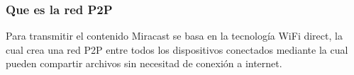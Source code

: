 \begin{frame}
  \frametitle{Que es la red P2P}
  Para transmitir el contenido Miracast se basa en la tecnología WiFi direct, la cual crea una red P2P entre todos los
  dispositivos conectados mediante la cual pueden compartir archivos sin necesitad de conexión a internet.
\end{frame}
